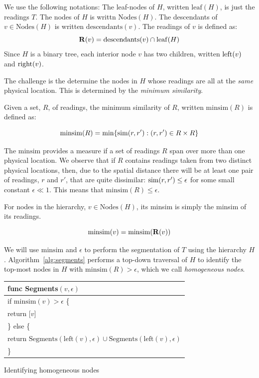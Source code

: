We use the following notations:
The leaf-nodes of $H$, written $\mathrm{leaf}(H)$, is just the readings $T$.  The nodes of $H$ is writtn $\mathrm{Nodes}(H)$.  The descendants of $v\in \mathrm{Nodes}(H)$ is written $\mathrm{descendants}(v)$.  The readings of $v$ is defined as: $$\mathbf{R}(v) = \mathrm{descendants}(v)\cap\mathrm{leaf}(H)$$
Since $H$ is a binary tree, each interior node $v$ has two children, written $\mathrm{left}(v)$ and $\mathrm{right}(v)$.

The challenge is the determine the nodes in $H$ whose readings are all at the
{\em same} physical location.  This is determined by the {\em minimum
similarity}.

\begin{definition}
    Given a set, $R$, of readings, the minimum similarity of $R$, written
    $\mathrm{minsim}(R)$ is defined as:

    $$\mathrm{minsim}(R) = \min\{\mathrm{sim}(r,r'): (r,r')\in R\times R\}$$
    \label{def:minsim}
\end{definition}

The $\mathrm{minsim}$ provides a measure if a set of readings $R$ span over more
than one physical location.
We observe that if $R$ contains readings taken from two distinct physical
locations, then, due to the spatial distance there will be at least one pair of
readings, $r$ and $r'$, that are quite dissimilar: $\mathrm{sim}(r, r') \leq \epsilon$ for some
small constant $\epsilon\ll 1$.  This means that $\mathrm{minsim}(R)\leq \epsilon$.

For nodes in the hierarchy, $v\in\mathrm{Nodes}(H)$, its minsim is simply the
minsim of its readings.

\begin{definition}
    $$\mathrm{minsim}(v) = \mathrm{minsim}(\mathbf{R}(v))$$
\end{definition}

We will use $\mathrm{minsim}$ and $\epsilon$ to perform the segmentation of $T$
using the hierarchy $H$.  Algorithm~\ref{alg:segments} performs a top-down
traversal of $H$ to identify the top-most nodes in $H$ with 
$\mathrm{minsim}(R) > \epsilon$, which we call {\em homogeneous nodes}.

\begin{algorithm}[t]
    \centering
    \begin{tabular}{|l|}\hline
        func Segments$(v, \epsilon)$ \\ \hline
        if $\mathrm{minsim}(v) > \epsilon$ \{ \\
        \RRR return [$v$] \\
        \} else \{ \\
        \RRR return $\mathrm{Segments}(\mathrm{left}(v), \epsilon) \cup
                      \mathrm{Segments}(\mathrm{left}(v), \epsilon)$ \\
        \} \\ \hline
    \end{tabular}
    \vspace{0.4cm}
    \caption{Identifying homogeneous nodes}
    \label{alg:segments}
\end{algorithm}

